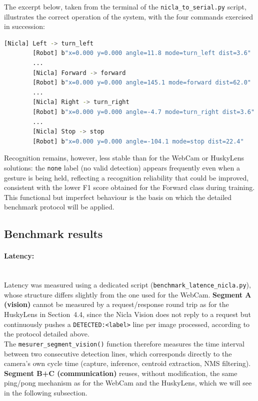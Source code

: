 \documentclass[12pt,a4paper]{report}
\begin{document}
	The excerpt below, taken from the terminal of the \texttt{nicla\_to\_serial.py} script, illustrates the correct operation of the system, with the four commands exercised in succession:
	
	\begin{lstlisting}[language=bash, breaklines=true, basicstyle=\ttfamily\footnotesize]
		[Nicla] Left -> turn_left
		[Robot] b"x=0.000 y=0.000 angle=11.8 mode=turn_left dist=3.6"
		...
		[Nicla] Forward -> forward
		[Robot] b"x=0.000 y=0.000 angle=145.1 mode=forward dist=62.0"
		...
		[Nicla] Right -> turn_right
		[Robot] b"x=0.000 y=0.000 angle=-4.7 mode=turn_right dist=3.6"
		...
		[Nicla] Stop -> stop
		[Robot] b"x=0.000 y=0.000 angle=-104.1 mode=stop dist=22.4"
	\end{lstlisting}
	
	Recognition remains, however, less stable than for the WebCam or HuskyLens solutions: the \texttt{none} label (no valid detection) appears frequently even when a gesture is being held, reflecting a recognition reliability that could be improved, consistent with the lower F1 score obtained for the Forward class during training. This functional but imperfect behaviour is the basis on which the detailed benchmark protocol will be applied.
	
	\subsection*{Benchmark results}
	
	
	\paragraph{Latency:} \mbox{} \\
	Latency was measured using a dedicated script (\texttt{benchmark\_latence\_nicla.py}), whose structure differs slightly from the one used for the WebCam. \textbf{Segment A (vision)} cannot be measured by a request/response round trip as for the HuskyLens in Section~4.4, since the Nicla Vision does not reply to a request but continuously pushes a \texttt{DETECTED:<label>} line per image processed, according to the protocol detailed above. \\ The \texttt{mesurer\_segment\_vision()} function therefore measures the time interval between two consecutive detection lines, which corresponds directly to the camera's own cycle time (capture, inference, centroid extraction, NMS filtering). \textbf{Segment B+C (communication)} reuses, without modification, the same ping/pong mechanism as for the WebCam and the HuskyLens, which we will see in the following subsection.
	
\end{document}
